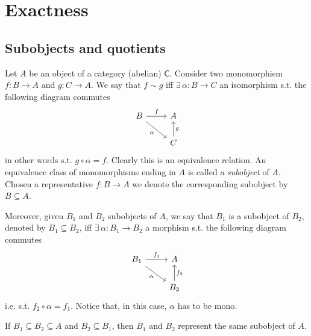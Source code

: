 \section{Exactness}
\subsection{Subobjects and quotients}
\begin{defn}[Subobject]
	Let $A$ be an object of a category (abelian) $\mathsf{C}$.
	Consider two monomorphism $f\colon B \to A$ and $g\colon C \to A$.
	We say that $f \sim g$ iff 
	$\exists\, \alpha\colon B \to C$ an isomorphism s.t. the following diagram commutes
	\begin{equation}
	\begin{tikzcd}
		B \arrow[r, "f", rightarrow] \arrow[rd, "\alpha"', rightarrow] &
		A\\
		&
		C \arrow[u, "g"', rightarrow] 
	\end{tikzcd}
	\end{equation} 
	in other words s.t. $g \circ \alpha = f$.
	Clearly this is an equivalence relation.
	An equivalence class of monomorphisms ending in $A$ is called a {\em subobject} of $A$.
	Chosen a representative $f\colon B \to A$ we denote the corresponding subobject by $B \subseteq A$.

	Moreover, given $B_1$ and $B_2$ subobjects of $A$, we say that $B_1$ is a subobject of $B_2$, 
	denoted by $B_1 \subseteq B_2$, iff
	$\exists\, \alpha\colon B_1 \to B_2$ a morphism s.t. the following diagram commutes
	\begin{equation}
	\begin{tikzcd}
		B_1 \arrow[r, "f_1", rightarrow] \arrow[rd, "\alpha"', rightarrow] &
		A\\
		&
		B_2 \arrow[u, "f_2"', rightarrow] 
	\end{tikzcd}
	\end{equation} 
	i.e. s.t. $f_2 \circ \alpha = f_1$.
	Notice that, in this case, $\alpha$ has to be mono.
\end{defn}

\begin{rem}
	If $B_1 \subseteq B_2 \subseteq A$ and $B_2 \subseteq B_1$, then $B_1$ and $B_2$ represent the same subobject of $A$.
\end{rem}

